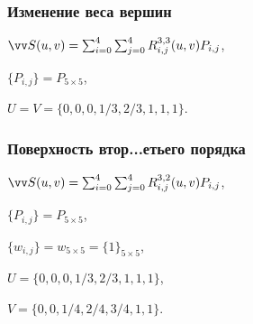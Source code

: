 \documentclass[10pt]{beamer}
\begin{document}
\begin{frame}\frametitle{Изменение веса вершин}
	
	{
	}{
		$\VV S(u,v)=\sum_{i=0}^4\sum_{j=0}^4R_{i,j}^{3,3}(u,v)P_{i,j}$,
		
		$\{P_{i,j}\}=P_{5\times5}$,
		
		
		$U=V=\{0,0,0,1/3,2/3,1,1,1\}$.
	}
	
\end{frame}



\begin{frame}\frametitle{Поверхность втор...етьего порядка}
	
	{
	}{
		$\VV S(u,v)=\sum_{i=0}^4\sum_{j=0}^4R_{i,j}^{3,2}(u,v)P_{i,j}$,
		
		$\{P_{i,j}\}=P_{5\times5}$,
		
		$\{w_{i,j}\}=w_{5\times5}=\{1\}_{5\times5}$,
		
		$U=\{0,0,0,1/3,2/3,1,1,1\}$,
		
		$V=\{0,0,1/4,2/4,3/4,1,1\}$.
	}
	
	
\end{frame}
\end{document}
